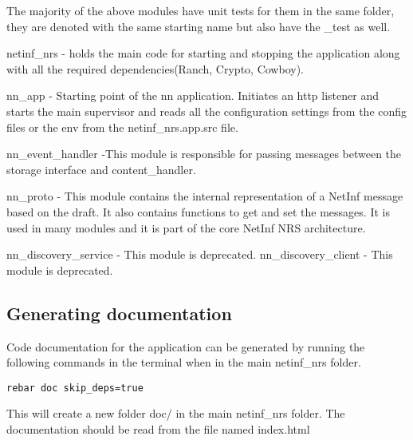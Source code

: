 The majority of the above modules have unit tests for them in the same folder, they are denoted with the same starting name but also have the \_test as well. 

netinf\_nrs - holds the main code for starting and stopping the application along with all the required dependencies(Ranch, Crypto, Cowboy).

nn\_app - Starting point of the nn application. Initiates an http listener and starts the main supervisor and reads all the configuration settings from the config files or the env from the netinf\_nrs.app.src file.

nn\_event\_handler -This module is responsible for passing messages between the storage interface and content\_handler. 

nn\_proto - This module contains the internal representation of a NetInf message based on the draft. It also contains functions to get and set the messages. It is used in many modules and it is part of the core NetInf NRS architecture.

nn\_discovery\_service - This module is deprecated.
nn\_discovery\_client - This module is deprecated.


\subsection{Generating documentation}

Code documentation for the application can be generated by running the following commands in the terminal when in the main netinf\_nrs folder.

\begin{verbatim}
rebar doc skip_deps=true
\end{verbatim}

This will create a new folder doc/ in the main netinf\_nrs folder. The documentation should be read from the file named index.html



